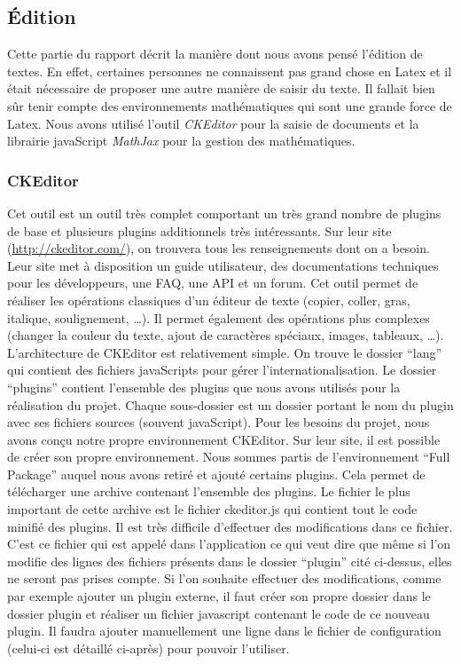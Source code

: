 \subsection{\'Edition}

Cette partie du rapport décrit la manière dont nous avons pensé l'édition de textes. En effet, certaines personnes ne connaissent pas grand chose en Latex et il était nécessaire de proposer une autre manière de saisir du texte. Il fallait bien sûr tenir compte des environnements mathématiques qui sont une grande force de Latex. Nous avons utilisé l'outil \emph{CKEditor} pour la saisie de documents et la librairie javaScript \emph{MathJax} pour la gestion des mathématiques. 

\subsubsection{CKEditor}

Cet outil est un outil très complet comportant un très grand nombre de plugins de base et plusieurs plugins additionnels très intéressants. Sur leur site (\url{http://ckeditor.com/}), on trouvera tous les renseignements dont on a besoin. Leur site met à disposition un guide utilisateur, des documentations techniques pour les développeurs, une FAQ, une API et un forum. Cet outil permet de réaliser les opérations classiques d'un éditeur de texte (copier, coller, gras, italique, soulignement, \ldots). Il permet également des opérations plus complexes (changer la couleur du texte, ajout de caractères spéciaux, images, tableaux, \ldots).\\

L'architecture de CKEditor est relativement simple. On trouve le dossier \enquote{lang} qui contient des fichiers javaScripts pour gérer l'internationalisation. Le dossier \enquote{plugins} contient l'ensemble des plugins que nous avons utilisés pour la réalisation du projet. Chaque sous-dossier est un dossier portant le nom du plugin avec ses fichiers sources (souvent javaScript). Pour les besoins du projet, nous avons conçu notre propre environnement CKEditor. Sur leur site, il est possible de créer son propre environnement. Nous sommes partis de l'environnement \enquote{Full Package} auquel nous avons retiré et ajouté certains plugins. Cela permet de télécharger une archive contenant l'ensemble des plugins. Le fichier le plus important de cette archive est le fichier ckeditor.js qui contient tout le code minifié des plugins. Il est très difficile d'effectuer des modifications dans ce fichier. C'est ce fichier qui est appelé dans l'application ce qui veut dire que même si l'on modifie des lignes des fichiers présents dans le dossier \enquote{plugin} cité ci-dessus, elles ne seront pas prises compte. Si l'on souhaite effectuer des modifications, comme par exemple ajouter un plugin externe, il faut créer son propre dossier dans le dossier plugin et réaliser un fichier javascript contenant le code de ce nouveau plugin. Il faudra ajouter manuellement une ligne dans le fichier de configuration (celui-ci est détaillé ci-après) pour pouvoir l'utiliser. 

